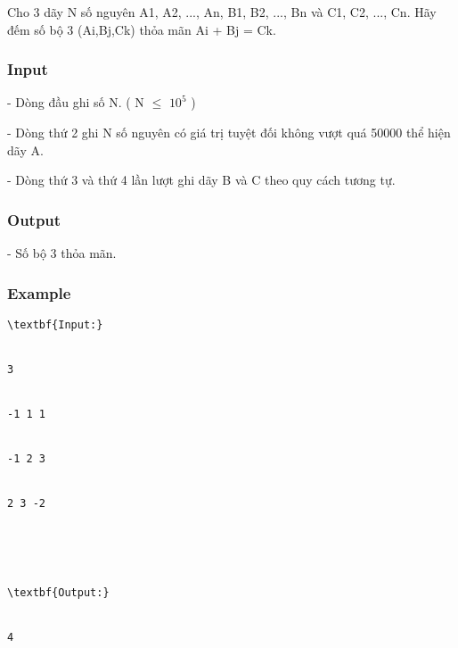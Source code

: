



   Cho 3 dãy N số nguyên A1, A2, ..., An, B1, B2, ..., Bn và C1, C2, ..., Cn. Hãy đếm số bộ 3 (Ai,Bj,Ck) thỏa mãn Ai + Bj = Ck.  

\subsubsection{   Input  }

   - Dòng đầu ghi số N. ( N  $\le$  $10^{5}$   )  

   - Dòng thứ 2 ghi N số nguyên có giá trị tuyệt đối không vượt quá 50000 thể hiện dãy A.  

   - Dòng thứ 3 và thứ 4 lần lượt ghi dãy B và C theo quy cách tương tự.  

\subsubsection{   Output  }

   - Số bộ 3 thỏa mãn.  

\subsubsection{   Example  }
\begin{verbatim}
\textbf{Input:}


3


-1 1 1


-1 2 3


2 3 -2





\textbf{Output:}


4


\end{verbatim}
